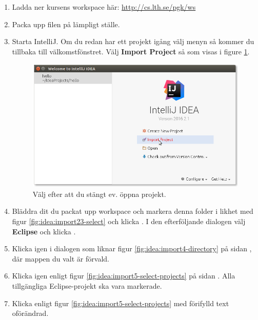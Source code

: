\begin{enumerate}
\item Ladda ner kursens workspace här: \url{http://cs.lth.se/pgk/ws}

\item Packa upp filen på lämpligt ställe.

\item Starta IntelliJ. Om du redan har ett projekt igång välj menyn  så kommer du tillbaka till välkomstfönstret. Välj \textbf{Import Project} så som visas i figure \ref{fig:idea:import1-project}.

\begin{figure}[H]
\centering
\includegraphics[width=1.0\textwidth]{../img/intellij/idea-import1-project.png} 
\caption{Välj  efter att du stängt ev. öppna projekt.}
\label{fig:idea:import1-project}
\end{figure}

\item Bläddra dit du packat upp workspace och markera denna folder i likhet med figur \ref{fig:idea:import23-select} och klicka . I den efterföljande dialogen välj \textbf{Eclipse} och klicka .

\item Klicka  igen i dialogen som liknar figur \ref{fig:idea:import4-directory} på sidan \pageref{fig:idea:import4-directory}, där mappen du valt är förvald.

\item Klicka  igen enligt figur \ref{fig:idea:import5-select-projects} på sidan  \pageref{fig:idea:import5-select-projects}. Alla tillgängliga Eclipse-projekt ska vara markerade.

\item Klicka  enligt figur \ref{fig:idea:import5-select-projects} med förifylld text oförändrad.


\end{enumerate}
